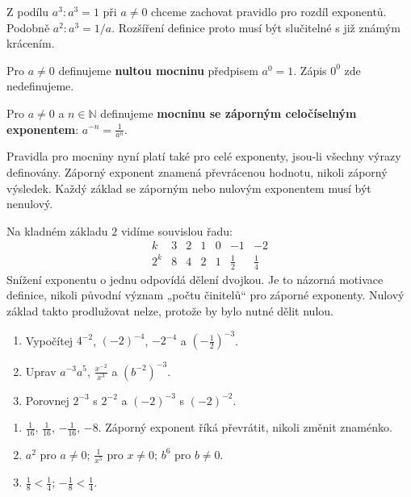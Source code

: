 \documentclass[11pt,a4paper]{article}
\begin{document}
Z podílu $a^3:a^3=1$ při $a\ne0$ chceme zachovat pravidlo pro rozdíl exponentů. Podobně $a^2:a^3=1/a$. Rozšíření definice proto musí být slučitelné s již známým krácením.

\begin{definiceBox}[title={Definice},breakable=false]
Pro $a\ne0$ definujeme \textbf{nultou mocninu} předpisem $a^0=1$. Zápis $0^0$ zde nedefinujeme.
\end{definiceBox}


\begin{definiceBox}[title={Definice},breakable=false]
Pro $a\ne0$ a $n\in\mathbb N$ definujeme \textbf{mocninu se záporným celočíselným exponentem}: $a^{-n}=\frac1{a^n}$.
\end{definiceBox}


Pravidla pro mocniny nyní platí také pro celé exponenty, jsou-li všechny výrazy definovány. Záporný exponent znamená převrácenou hodnotu, nikoli záporný výsledek. Každý základ se záporným nebo nulovým exponentem musí být nenulový.

Na kladném základu $2$ vidíme souvislou řadu:
\[
\begin{array}{c|rrrrrr}
k&3&2&1&0&-1&-2\\ \hline
2^k&8&4&2&1&\frac12&\frac14
\end{array}
\]
Snížení exponentu o jednu odpovídá dělení dvojkou.
Je to názorná motivace definice, nikoli původní význam „počtu činitelů“
pro záporné exponenty. Nulový základ takto prodlužovat nelze,
protože by bylo nutné dělit nulou.

\begin{zadaniReseniBox}[title={Mezikrok: převrácená hodnota a znaménko},breakable=false]
\begin{enumerate}[label=\alph*)]
\item Vypočítej $4^{-2}$, $(-2)^{-4}$, $-2^{-4}$ a $(-\tfrac12)^{-3}$.
\item Uprav $a^{-3}a^5$, $\frac{x^{-2}}{x^3}$ a $(b^{-2})^{-3}$.
\item Porovnej $2^{-3}$ s $2^{-2}$ a $(-2)^{-3}$ s $(-2)^{-2}$.
\end{enumerate}
\tcblower
\begin{enumerate}[label=\alph*)]
\item $\frac1{16}$, $\frac1{16}$, $-\frac1{16}$, $-8$. Záporný exponent říká převrátit, nikoli změnit znaménko.
\item $a^2$ pro $a\ne0$; $\frac1{x^5}$ pro $x\ne0$; $b^6$ pro $b\ne0$.
\item $\frac18<\frac14$; $-\frac18<\frac14$.
\end{enumerate}
\end{zadaniReseniBox}
\end{document}

